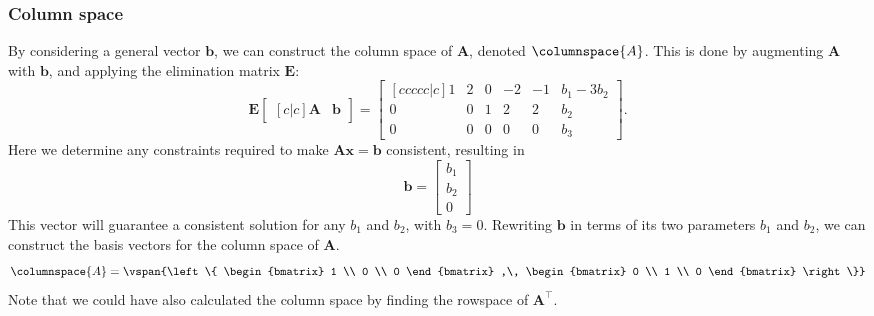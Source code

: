 \documentclass{article}
\begin{document}
\subsubsection{Column space}
By considering a general vector \(\symbf{b}\), we can construct the
column space of \(\symbf{A}\), denoted \(\columnspace{A}\). This is
done by augmenting \(\symbf{A}\) with \(\symbf{b}\), and applying the
elimination matrix \(\symbf{E}\):
\begin{equation*}
    \symbf{E}
    \begin{bmatrix}[c|c]
        \symbf{A} & \symbf{b}
    \end{bmatrix}
    =
    \begin{bmatrix}[ccccc|c]
        1 & 2 & 0 & -2 & -1 & b_1 - 3b_2 \\
        0 & 0 & 1 & 2  & 2  & b_2        \\
        0 & 0 & 0 & 0  & 0  & b_3
    \end{bmatrix}
    .
\end{equation*}
Here we determine any constraints required to make \(\symbf{A}\symbf{x} = \symbf{b}\)
consistent, resulting in
\begin{equation*}
    \symbf{b} =
    \begin{bmatrix}
        b_1 \\
        b_2 \\
        0
    \end{bmatrix}
\end{equation*}
This vector will guarantee a consistent solution for any \(b_1\) and \(b_2\), with \(b_3 = 0\).
Rewriting \(\symbf{b}\) in terms of its two parameters \(b_1\) and
\(b_2\), we can construct the basis vectors for the column space of
\(\symbf{A}\).
\begin{equation*}
    \columnspace{A} =
    \vspan{\left\{
        \begin{bmatrix}
            1 \\
            0 \\
            0
        \end{bmatrix}
        ,\,
        \begin{bmatrix}
            0 \\
            1 \\
            0
        \end{bmatrix}
        \right\}}
\end{equation*}
Note that we could have also calculated the column space by finding the rowspace of \(\symbf{A}^\top\).
\end{document}
